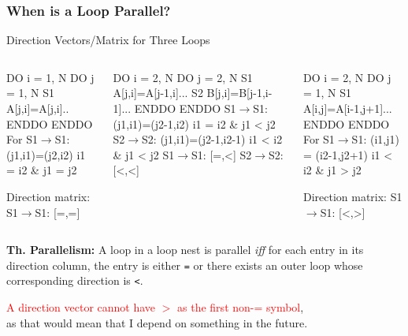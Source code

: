 \documentclass{beamer}
\newcommand{\red}[1]{\textcolor{Red}{{#1}}}
\newcommand{\emp}[1]{\textcolor{DikuRed}{ #1}}
\newcommand{\mymath}[1]{$ #1 $}
\begin{document}
\begin{frame}[fragile,t]
  \frametitle{When is a Loop Parallel?} %

\begin{block}{Direction Vectors/Matrix for Three Loops }
\begin{columns}
\begin{colorcode}
  DO i = 1, N
    DO j = 1, N
S1    A[j,i]=A[j,i]..
    ENDDO
  ENDDO\pause
For S1\mymath{\rightarrow}S1: 
    (j1,i1)=(j2,i2) 
    i1 \emp{=} i2 \& j1 \emp{=} j2

Direction matrix:
S1\mymath{\rightarrow}S1: \emp{[=,=]}
\end{colorcode}
\begin{colorcode}
  DO i = 2, N
    DO j = 2, N
S1    A[j,i]=A[j-1,i]...
S2    B[j,i]=B[j-1,i-1]...
    ENDDO
  ENDDO\pause
S1\mymath{\rightarrow}S1: (j1,i1)=(j2-1,i2)
        i1 \emp{=} i2 \& j1 \emp{<} j2
S2\mymath{\rightarrow}S2: (j1,i1)=(j2-1,i2-1)
        i1 \emp{<} i2 \& j1 \emp{<} j2
S1\mymath{\rightarrow}S1: \emp{[=,<]}
S2\mymath{\rightarrow}S2: \emp{[<,<]}
\end{colorcode}
\begin{colorcode}
  DO i = 2, N
    DO j = 1, N
S1    A[i,j]=A[i-1,j+1]...
    ENDDO
  ENDDO
For S1\mymath{\rightarrow}S1:\pause
    (i1,j1) = (i2-1,j2+1)
    i1 \emp{<} i2 \& j1 \emp{>} j2

Direction matrix:
S1\mymath{\rightarrow}S1: \emp{[<,>]}
\end{colorcode}
\end{columns}
\end{block} 

{\bf Th. Parallelism:} A loop in a loop nest is parallel {\em iff} for each entry in its direction column, the entry is either {\tt =} or there exists an outer loop whose corresponding direction is {\tt <}. 

\smallskip

\red{A direction vector cannot have $>$ as the first non-= symbol},\\
as that would mean that I depend on something in the future. 
\end{frame}
\end{document}
